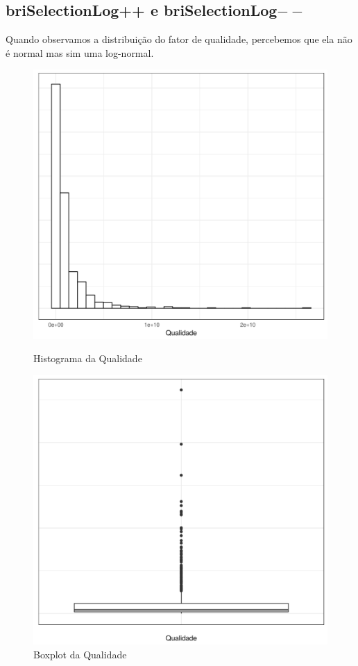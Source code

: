 \documentclass[]{article}
\begin{document}
	\subsection{briSelectionLog++ e briSelectionLog$--$} 
	Quando observamos a distribuição do fator de qualidade, percebemos que ela não é normal mas sim uma log-normal.
	
	\begin{figure}[H]
		\centering
		\begin{minipage}[b]{0.4\textwidth}
			\includegraphics[width=\textwidth]{imgs/histograma.png}
			\caption{Histograma da Qualidade}
		\end{minipage}
		\hfill
		\begin{minipage}[b]{0.4\textwidth}
			\includegraphics[width=\textwidth]{imgs/boxplot.png}
			\caption{Boxplot da Qualidade}
		\end{minipage}
	\end{figure}
	
\end{document}
